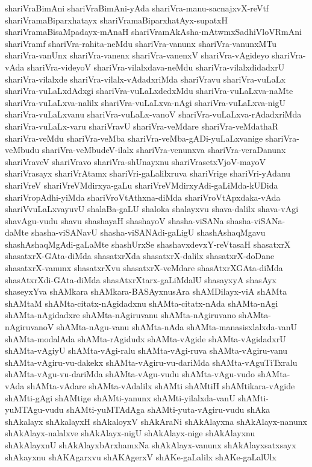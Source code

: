 {shariVraBimAni
shariVraBimAni-yAda
shariVra-manu-sacnajxvX-reVtf
shariVramaBiparxhatayx
shariVramaBiparxhatAyx-supatxH
shariVramaBisaMpadayx-mAnaH
shariVramAkAsha-mAtwmxSadhiVloVRmAni
shariVramf
shariVra-rahita-neMdu
shariVra-vanunx
shariVra-vanunxMTu
shariVra-vanUnx
shariVra-vanenx
shariVra-vanenxV
shariVra-vAgideyo
shariVra-vAda
shariVra-videyoV
shariVra-vilalxdava-neMdu
shariVra-vilalxdidadxrU
shariVra-vilalxde
shariVra-vilalx-vAdadxriMda
shariVravu
shariVra-vuLaLx
shariVra-vuLaLxdAdxgi
shariVra-vuLaLxdedxMdu
shariVra-vuLaLxva-naMte
shariVra-vuLaLxva-nalilx
shariVra-vuLaLxva-nAgi
shariVra-vuLaLxva-nigU
shariVra-vuLaLxvanu
shariVra-vuLaLx-vanoV
shariVra-vuLaLxva-rAdadxriMda
shariVra-vuLaLx-varu
shariVravU
shariVra-veMdare
shariVra-veMdathaR
shariVra-veMdu
shariVra-veMba
shariVra-veMba-gADi-yuLaLxvanige
shariVra-veMbudu
shariVra-veMbudeV-ilalx
shariVra-venunxva
shariVra-veraDanunx
shariVraveV
shariVravo
shariVra-shUnayxnu
shariVrasetxVjoV-mayoV
shariVrasayx
shariVrAtamx
shariVri-gaLalilxruva
shariVrige
shariVri-yAdanu
shariVreV
shariVreVMdirxya-gaLu
shariVreVMdirxyAdi-gaLiMda-kUDida
shariVropAdhi-yiMda
shariVroVtAthxna-diMda
shariVroVtApxdaka-vAda
shariVvuLaLxvayuvU
shalaBa-gaLU
shaloka
shalayxvu
shava-dalilx
shava-vAgi
shavAgu-vudu
shavu
shashayaH
shashayoV
shasha-viSANa
shasha-viSANa-daMte
shasha-viSANavU
shasha-viSANAdi-gaLigU
shashAshaqMgavu
shashAshaqMgAdi-gaLaMte
shashUrxSe
shashavxdevxY-reVtasaH
shasatxrX
shasatxrX-GAta-diMda
shasatxrXda
shasatxrX-dalilx
shasatxrX-doDane
shasatxrX-vanunx
shasatxrXvu
shasatxrX-veMdare
shasAtxrXGAta-diMda
shasAtxrXdi-GAta-diMda
shasAtxrXtarx-gaLiMdalU
shasayxyA
shasAyx
shaseyxYva
shAMkara
shAMkara-BASAyxnusAra
shAMDilayx-viA
shAMta
shAMtaM
shAMta-citatx-nAgidadxnu
shAMta-citatx-nAda
shAMta-nAgi
shAMta-nAgidadxre
shAMta-nAgiruvanu
shAMta-nAgiruvano
shAMta-nAgiruvanoV
shAMta-nAgu-vanu
shAMta-nAda
shAMta-manasisxlalxda-vanU
shAMta-modalAda
shAMta-rAgidudx
shAMta-vAgide
shAMta-vAgidadxrU
shAMta-vAgiyU
shAMta-vAgi-ralu
shAMta-vAgi-ruva
shAMta-vAgiru-vanu
shAMta-vAgiru-vu-dakekx
shAMta-vAgiru-vu-dariMda
shAMta-vAguTiTxralu
shAMta-vAgu-vu-dariMda
shAMta-vAgu-vudu
shAMta-vAgu-vudo
shAMta-vAda
shAMta-vAdare
shAMta-vAdalilx
shAMti
shAMtiH
shAMtikara-vAgide
shAMti-gAgi
shAMtige
shAMti-yanunx
shAMti-yilalxda-vanU
shAMti-yuMTAgu-vudu
shAMti-yuMTAdAga
shAMti-yuta-vAgiru-vudu
shAka
shAkalayx
shAkalayxH
shAkaloyxV
shAkAraNi
shAkAlayxna
shAkAlayx-nanunx
shAkAlayx-nalalxve
shAkAlayx-nigU
shAkAlayx-nige
shAkAlayxnu
shAkAlayxnU
shAkAlayxbArxhamxNa
shAkAlayx-vanunx
shAkAlayxsatxsayx
shAkayxnu
shAKAgarxvu
shAKAgerxV
shAKe-gaLalilx
shAKe-gaLalUlx
}
